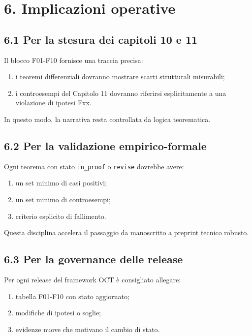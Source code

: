 \section{6. Implicazioni operative}

\subsection{6.1 Per la stesura dei capitoli 10 e 11}

Il blocco F01-F10 fornisce una traccia precisa:

\begin{enumerate}
\def\labelenumi{\arabic{enumi}.}
\tightlist
\item
  i teoremi differenziali dovranno mostrare scarti strutturali misurabili;
\item
  i controesempi del Capitolo 11 dovranno riferirsi esplicitamente a una violazione di ipotesi Fxx.
\end{enumerate}

In questo modo, la narrativa resta controllata da logica teorematica.

\subsection{6.2 Per la validazione empirico-formale}

Ogni teorema con stato \texttt{in\_proof} o \texttt{revise} dovrebbe avere:

\begin{enumerate}
\def\labelenumi{\arabic{enumi}.}
\tightlist
\item
  un set minimo di casi positivi;
\item
  un set minimo di controesempi;
\item
  criterio esplicito di fallimento.
\end{enumerate}

Questa disciplina accelera il passaggio da manoscritto a preprint tecnico robusto.

\subsection{6.3 Per la governance delle release}

Per ogni release del framework OCT è consigliato allegare:

\begin{enumerate}
\def\labelenumi{\arabic{enumi}.}
\tightlist
\item
  tabella F01-F10 con stato aggiornato;
\item
  modifiche di ipotesi o soglie;
\item
  evidenze nuove che motivano il cambio di stato.
\end{enumerate}

